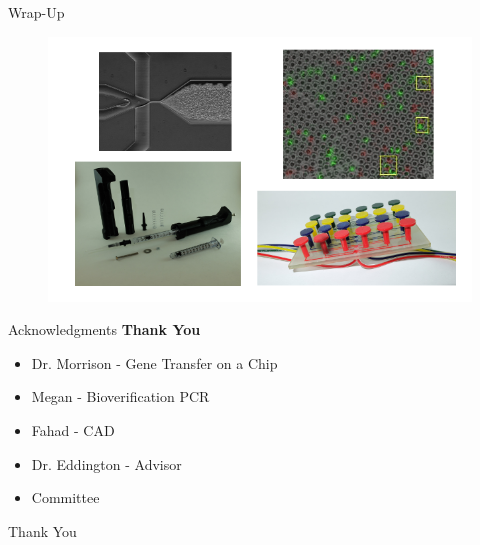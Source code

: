 \documentclass{beamer}
\begin{document}
\begin{frame}{Wrap-Up}
\begin{figure}
	\includegraphics[width=1\linewidth]{images/wrap-up.png}
\end{figure}
\end{frame}

\begin{frame}{Acknowledgments}
	\textbf{Thank You}
	\begin{itemize}
		\item Dr. Morrison - Gene Transfer on a Chip
		\item Megan - Bioverification PCR
		\item Fahad - CAD 
		\item Dr. Eddington - Advisor 
		\item Committee 
	\end{itemize}
\end{frame}

\begin{frame}
\Huge{\centerline{Thank You}}
\end{frame}








\end{document}
